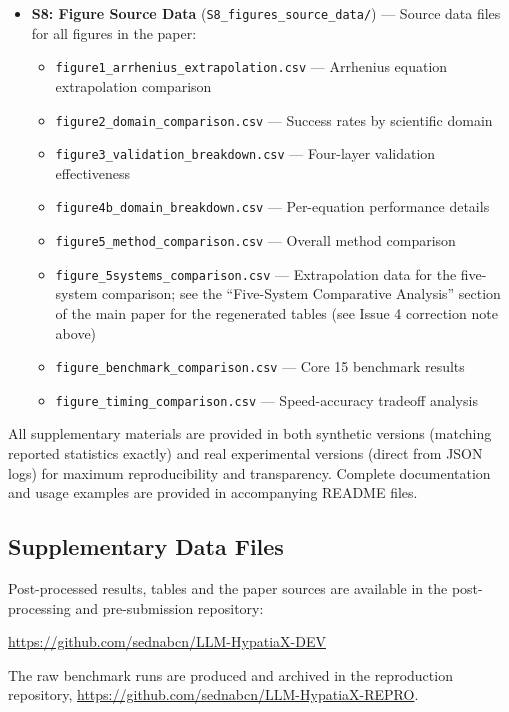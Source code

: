 \documentclass[twoside,11pt]{article}
\begin{document}
\begin{itemize}
\item \textbf{S8: Figure Source Data} (\texttt{S8\_figures\_source\_data/}) --- Source data files for all figures in the paper:
\begin{itemize}
\item \texttt{figure1\_arrhenius\_extrapolation.csv} --- Arrhenius equation extrapolation comparison
\item \texttt{figure2\_domain\_comparison.csv} --- Success rates by scientific domain
\item \texttt{figure3\_validation\_breakdown.csv} --- Four-layer validation effectiveness
\item \texttt{figure4b\_domain\_breakdown.csv} --- Per-equation performance details
\item \texttt{figure5\_method\_comparison.csv} --- Overall method comparison
\item \texttt{figure\_5systems\_comparison.csv} --- Extrapolation data for the five-system comparison; see the ``Five-System Comparative Analysis'' section of the main paper for the regenerated tables (see Issue 4 correction note above)
\item \texttt{figure\_benchmark\_comparison.csv} --- Core 15 benchmark results
\item \texttt{figure\_timing\_comparison.csv} --- Speed-accuracy tradeoff analysis
\end{itemize}
\end{itemize}

All supplementary materials are provided in both synthetic versions (matching reported statistics exactly) and real experimental versions (direct from JSON logs) for maximum reproducibility and transparency. Complete documentation and usage examples are provided in accompanying README files.

\subsection{Supplementary Data Files}

Post-processed results, tables and the paper sources are available in the
post-processing and pre-submission repository:
\begin{center}
{\small\url{https://github.com/sednabcn/LLM-HypatiaX-DEV}}
\end{center}
The raw benchmark runs are produced and archived in the reproduction
repository, \url{https://github.com/sednabcn/LLM-HypatiaX-REPRO}.
\end{document}
